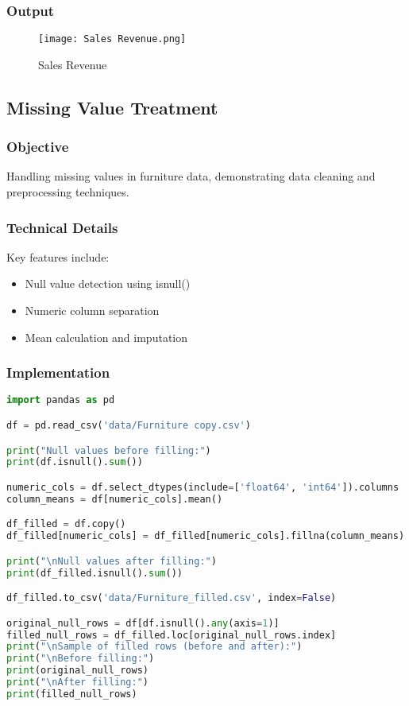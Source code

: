 \documentclass[12pt]{article}
\begin{document}
\subsubsection{Output}

\begin{figure}[h]
    \centering
    \texttt{[image: Sales Revenue.png]}
    \caption{Sales Revenue}
    \label{fig:enter-label}
\end{figure}


\subsection{Missing Value Treatment\hfill\href{https://github.com/sabbirahmed404/Python-Practice/blob/main/pandas_2.py}{\faGithub}}
\subsubsection{Objective}
Handling missing values in furniture data, demonstrating data cleaning and preprocessing techniques.

\subsubsection{Technical Details}
Key features include:
\begin{itemize}
    \item Null value detection using isnull()
    \item Numeric column separation
    \item Mean calculation and imputation
\end{itemize}

\subsubsection{Implementation}
\begin{lstlisting}[language=Python, caption=Missing Value Treatment Implementation]
import pandas as pd

df = pd.read_csv('data/Furniture copy.csv')

print("Null values before filling:")
print(df.isnull().sum())

numeric_cols = df.select_dtypes(include=['float64', 'int64']).columns
column_means = df[numeric_cols].mean()

df_filled = df.copy()
df_filled[numeric_cols] = df_filled[numeric_cols].fillna(column_means)

print("\nNull values after filling:")
print(df_filled.isnull().sum())

df_filled.to_csv('data/Furniture_filled.csv', index=False)

original_null_rows = df[df.isnull().any(axis=1)]
filled_null_rows = df_filled.loc[original_null_rows.index]
print("\nSample of filled rows (before and after):")
print("\nBefore filling:")
print(original_null_rows)
print("\nAfter filling:")
print(filled_null_rows)
\end{lstlisting}
\end{document}
